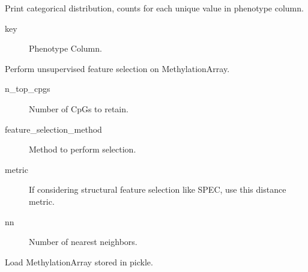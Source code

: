 \documentclass[letterpaper,10pt,english]{sphinxmanual}
\begin{document}
\begin{fulllineitems}
\begin{fulllineitems}
\label{\detokenize{index:pymethylprocess.MethylationDataTypes.MethylationArray.categorical_breakdown}}
Print categorical distribution, counts for each unique value in phenotype column.
\begin{description}
\item[{key}] \leavevmode
Phenotype Column.

\end{description}

\end{fulllineitems}


\begin{fulllineitems}
\label{\detokenize{index:pymethylprocess.MethylationDataTypes.MethylationArray.feature_select}}
Perform unsupervised feature selection on MethylationArray.
\begin{description}
\item[{n\_top\_cpgs}] \leavevmode
Number of CpGs to retain.

\item[{feature\_selection\_method}] \leavevmode
Method to perform selection.

\item[{metric}] \leavevmode
If considering structural feature selection like SPEC, use this distance metric.

\item[{nn}] \leavevmode
Number of nearest neighbors.

\end{description}

\end{fulllineitems}


\begin{fulllineitems}
\label{\detokenize{index:pymethylprocess.MethylationDataTypes.MethylationArray.from_pickle}}
Load MethylationArray stored in pickle.


\end{fulllineitems}
\end{fulllineitems}
\end{document}
